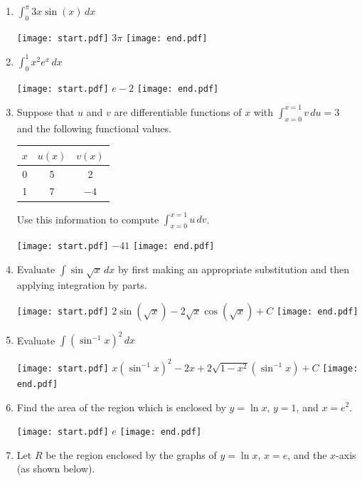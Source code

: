 \documentclass[12pt]{article}
\begin{document}
\begin{enumerate}
\item $\int_{0}^{\pi}3x\sin{(x)}\,dx$ 

\texttt{[image: start.pdf]}
{{$3\pi$}}
\texttt{[image: end.pdf]}


\item $\int_{0}^{1}x^2e^{x}\,dx$ 

\texttt{[image: start.pdf]}
{{$e-2$}}
\texttt{[image: end.pdf]}


\item Suppose that $u$ and $v$ are differentiable functions of $x$ with $\int_{x=0}^{x=1} v \,du = 3$ and the following functional values.\\
\begin{center}
\begin{tabular}{|c|c|c|}
\hline
$x$ & $u(x)$ & $v(x)$\\
\hline
0 & 5 & 2 \\
\hline
1 & 7 & $-4$\\
\hline
\end{tabular}
\end{center}
Use this information to compute $\int_{x=0}^{x=1} u \,dv$.

\texttt{[image: start.pdf]}
{{$-41$}}
\texttt{[image: end.pdf]}


\item Evaluate $\int \sin{\sqrt{x}} \,dx$ by first making an appropriate substitution and then applying integration by parts.

\texttt{[image: start.pdf]}
{{$2\sin{(\sqrt{x})}-2\sqrt{x}\cos{(\sqrt{x})}+C$}}
\texttt{[image: end.pdf]}


\item Evaluate $\int \left(\sin^{-1}x\right)^2 \,dx$

\texttt{[image: start.pdf]}
{{$x\left(\sin^{-1}x\right)^2-2x+2\sqrt{1-x^2}\left(\sin^{-1}x\right)+C$}}
\texttt{[image: end.pdf]}


\item Find the area of the region which is enclosed by $y=\ln{x}$, $y=1$, and $x=e^2$.

\texttt{[image: start.pdf]}
{{$e$}}
\texttt{[image: end.pdf]}


\item Let $R$ be the region enclosed by the graphs of $y=\ln{x}$, $x=e$, and the $x$-axis (as shown below).


\end{enumerate}
\end{document}
